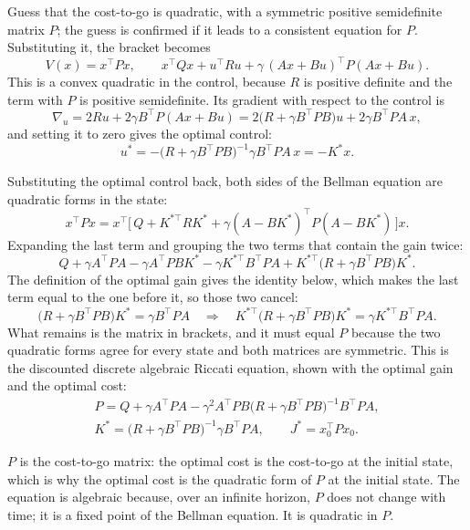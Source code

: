 \documentclass[11pt]{article}
\begin{document}
Guess that the cost-to-go is quadratic, with a symmetric positive semidefinite matrix $P$; the guess
is confirmed if it leads to a consistent equation for $P$. Substituting it, the bracket becomes
\[
  V(x) = x^\top P x, \qquad x^\top Q x + u^\top R u + \gamma\, (A x + B u)^\top P (A x + B u).
\]
This is a convex quadratic in the control, because $R$ is positive definite and the term with $P$ is
positive semidefinite. Its gradient with respect to the control is
\[
  \nabla_u = 2 R u + 2 \gamma B^\top P (A x + B u)
  = 2\big(R + \gamma B^\top P B\big) u + 2 \gamma B^\top P A\, x ,
\]
and setting it to zero gives the optimal control:
\[
  u^* = -\big(R + \gamma B^\top P B\big)^{-1} \gamma B^\top P A\, x = -K^* x .
\]

Substituting the optimal control back, both sides of the Bellman equation are quadratic forms in
the state:
\[
  x^\top P x = x^\top \Big[\, Q + K^{*\top} R K^* + \gamma (A - B K^*)^\top P (A - B K^*) \,\Big] x .
\]
Expanding the last term and grouping the two terms that contain the gain twice:
\[
  Q + \gamma A^\top P A - \gamma A^\top P B K^* - \gamma K^{*\top} B^\top P A
  + K^{*\top} \big(R + \gamma B^\top P B\big) K^* .
\]
The definition of the optimal gain gives the identity below, which makes the last term equal to the
one before it, so those two cancel:
\[
  \big(R + \gamma B^\top P B\big) K^* = \gamma B^\top P A
  \quad\Longrightarrow\quad
  K^{*\top} \big(R + \gamma B^\top P B\big) K^* = \gamma K^{*\top} B^\top P A .
\]
What remains is the matrix in brackets, and it must equal $P$ because the two quadratic forms agree
for every state and both matrices are symmetric. This is the discounted discrete algebraic Riccati
equation, shown with the optimal gain and the optimal cost:
\begin{gather*}
  P = Q + \gamma A^\top P A - \gamma^2 A^\top P B \big(R + \gamma B^\top P B\big)^{-1} B^\top P A, \\
  K^* = \big(R + \gamma B^\top P B\big)^{-1} \gamma B^\top P A, \qquad J^* = x_0^\top P x_0 .
\end{gather*}

$P$ is the cost-to-go matrix: the optimal cost is the cost-to-go at the initial state, which is why
the optimal cost is the quadratic form of $P$ at the initial state. The equation is algebraic
because, over an infinite horizon, $P$ does not change with time; it is a fixed point of the Bellman
equation. It is quadratic in $P$.
\end{document}
